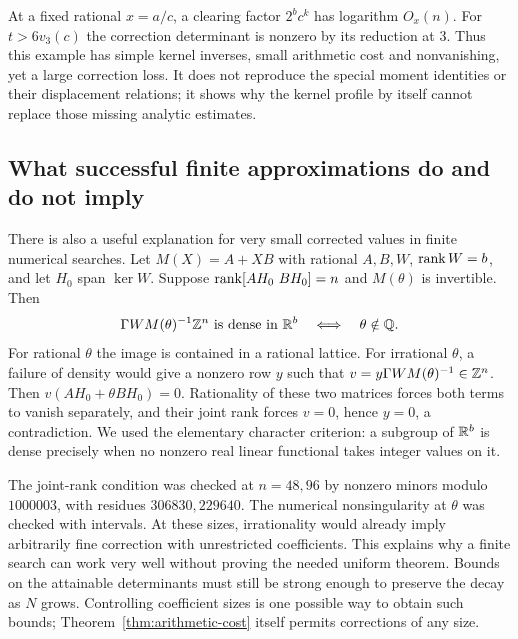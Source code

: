 At a fixed rational $x=a/c$, a clearing factor $2^bc^k$ has logarithm
$O_x(n)$. For $t>6v_3(c)$ the correction determinant is nonzero by
its reduction at $3$. Thus this example has simple kernel inverses,
small arithmetic cost and nonvanishing, yet a large correction loss.
It does not reproduce the special moment identities or their
displacement relations; it shows why the kernel profile by itself
cannot replace those missing analytic estimates.

\subsection{What successful finite approximations do and do not imply}

There is also a useful explanation for very small corrected values in
finite numerical searches. Let $M(X)=A+XB$ with rational $A,B,W$,
$\operatorname{rank} W=b$, and let $H_0$ span $\ker W$. Suppose
$\operatorname{rank}[AH_0\ BH_0]=n$ and $M(\theta)$ is invertible. Then
\begin{equation}\label{eq:conditional-density}
 \Gamma WM(\theta)^{-1}\mathbb Z^n\text{ is dense in }\mathbb R^b
 \quad\Longleftrightarrow\quad\theta\notin\mathbb Q.
\end{equation}
For rational $\theta$ the image is contained in a rational lattice.
For irrational $\theta$, a failure of density would give a nonzero
row $y$ such that $v=y\Gamma WM(\theta)^{-1}\in\mathbb Z^n$.
Then $v(AH_0+\theta BH_0)=0$. Rationality of these two matrices
forces both terms to vanish separately, and their joint rank forces
$v=0$, hence $y=0$, a contradiction. We used the elementary character
criterion: a subgroup of $\mathbb R^b$ is dense precisely when no nonzero
real linear functional takes integer values on it.

The joint-rank condition was checked at $n=48,96$ by nonzero minors
modulo $1000003$, with residues $306830,229640$. The numerical
nonsingularity at $\theta$ was checked with intervals. At these sizes,
irrationality would already imply arbitrarily fine correction with
unrestricted coefficients. This explains why a finite search can work
very well without proving the needed uniform theorem. Bounds on the
attainable determinants must still be strong enough to preserve the
decay as $N$ grows. Controlling coefficient sizes is one possible way
to obtain such bounds; Theorem~\ref{thm:arithmetic-cost} itself permits
corrections of any size.
